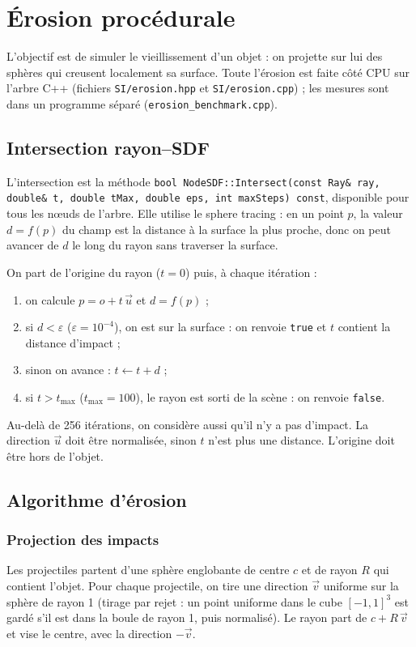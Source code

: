 \documentclass[11pt,a4paper]{article}
\begin{document}
\section{Érosion procédurale}
L'objectif est de simuler le vieillissement d'un objet : on projette sur lui des sphères qui creusent localement sa surface. Toute l'érosion est faite côté CPU sur l'arbre C++ (fichiers \texttt{SI/erosion.hpp} et \texttt{SI/erosion.cpp}) ; les mesures sont dans un programme séparé (\texttt{erosion\_benchmark.cpp}).

\subsection{Intersection rayon--SDF}
L'intersection est la méthode \texttt{bool NodeSDF::Intersect(const Ray\& ray, double\& t, double tMax, double eps, int maxSteps) const}, disponible pour tous les nœuds de l'arbre. Elle utilise le sphere tracing : en un point $p$, la valeur $d = f(p)$ du champ est la distance à la surface la plus proche, donc on peut avancer de $d$ le long du rayon sans traverser la surface.

On part de l'origine du rayon ($t = 0$) puis, à chaque itération :
\begin{enumerate}
  \item on calcule $p = o + t\,\vec{u}$ et $d = f(p)$ ;
  \item si $d < \varepsilon$ ($\varepsilon = 10^{-4}$), on est sur la surface : on renvoie \texttt{true} et $t$ contient la distance d'impact ;
  \item sinon on avance : $t \leftarrow t + d$ ;
  \item si $t > t_{\max}$ ($t_{\max} = 100$), le rayon est sorti de la scène : on renvoie \texttt{false}.
\end{enumerate}
Au-delà de 256 itérations, on considère aussi qu'il n'y a pas d'impact. La direction $\vec{u}$ doit être normalisée, sinon $t$ n'est plus une distance. L'origine doit être hors de l'objet.

\subsection{Algorithme d'érosion}
\subsubsection{Projection des impacts}
Les projectiles partent d'une sphère englobante de centre $c$ et de rayon $R$ qui contient l'objet. Pour chaque projectile, on tire une direction $\vec{v}$ uniforme sur la sphère de rayon 1 (tirage par rejet : un point uniforme dans le cube $[-1,1]^3$ est gardé s'il est dans la boule de rayon 1, puis normalisé). Le rayon part de $c + R\,\vec{v}$ et vise le centre, avec la direction $-\vec{v}$.
\end{document}
